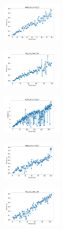 \begin{figure}[H]
\begin{subfigure}
    \end{subfigure}
    \hfill
    \begin{subfigure}
        \centering
        \includegraphics[width=0.32\textwidth]{img/bl/rand_set_const_10_589741062_time.png}
    \end{subfigure}
    \hfill
    \begin{subfigure}
        \centering
        \includegraphics[width=0.32\textwidth]{img/bl/iris_set_const_10_277451237_time.png}
    \end{subfigure}
    \hfill
    \begin{subfigure}
        \centering
        \includegraphics[width=0.32\textwidth]{img/bl/ecoli_set_const_10_277451237_time.png}
    \end{subfigure}
    \hfill
    \begin{subfigure}
        \centering
        \includegraphics[width=0.32\textwidth]{img/bl/rand_set_const_10_277451237_time.png}
    \end{subfigure}
    \hfill
    \begin{subfigure}
        \centering
        \includegraphics[width=0.32\textwidth]{img/bl/iris_set_const_10_49258669_time.png}

\end{subfigure}
\end{figure}
